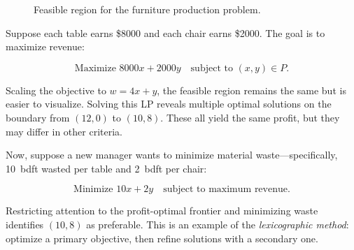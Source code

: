 \begin{figure}[h]
    \centering
    


    \caption{Feasible region for the furniture production problem.}
\end{figure}

Suppose each table earns \$8000 and each chair earns \$2000. The goal is to maximize revenue:

\[
\text{Maximize } 8000x + 2000y \quad \text{subject to } (x, y) \in P.
\]

Scaling the objective to \(w = 4x + y\), the feasible region remains the same but is easier to visualize. Solving this LP reveals multiple optimal solutions on the boundary from \((12, 0)\) to \((10, 8)\). These all yield the same profit, but they may differ in other criteria.

Now, suppose a new manager wants to minimize material waste—specifically, 10~bdft wasted per table and 2~bdft per chair:

\[
\text{Minimize } 10x + 2y \quad \text{subject to maximum revenue}.
\]

Restricting attention to the profit-optimal frontier and minimizing waste identifies \((10, 8)\) as preferable. This is an example of the \emph{lexicographic method}: optimize a primary objective, then refine solutions with a secondary one.

